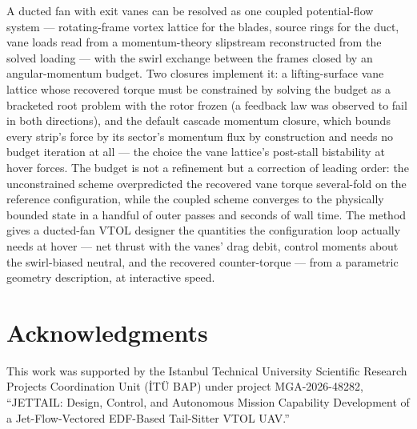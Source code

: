 \documentclass[]{aiaa-tc}%
\begin{document}
A ducted fan with exit vanes can be resolved as one coupled
potential-flow system --- rotating-frame vortex lattice for the
blades, source rings for the duct, vane loads read from a
momentum-theory slipstream reconstructed from the solved loading ---
with the swirl exchange between the frames closed by an
angular-momentum budget. Two closures implement it: a lifting-surface
vane lattice whose recovered torque must be constrained by solving the
budget as a bracketed root problem with the rotor frozen (a feedback
law was observed to fail in both directions), and the default cascade
momentum closure, which bounds every strip's force by its sector's
momentum flux by construction and needs no budget iteration at all
--- the choice the vane lattice's post-stall bistability at hover
forces. The budget is not a refinement but a correction of leading
order: the unconstrained scheme overpredicted the recovered vane
torque several-fold on the reference configuration, while the coupled
scheme converges to the physically bounded state in a handful of outer
passes and seconds of wall time. The method gives a ducted-fan VTOL
designer the quantities the configuration loop actually needs at hover
--- net thrust with the vanes' drag debit, control moments about the
swirl-biased neutral, and the recovered counter-torque --- from a
parametric geometry description, at interactive speed.


\section*{Acknowledgments}

This work was supported by the Istanbul Technical University
Scientific Research Projects Coordination Unit (\.IT\"U BAP) under
project MGA-2026-48282, ``JETTAIL: Design, Control, and Autonomous
Mission Capability Development of a Jet-Flow-Vectored EDF-Based
Tail-Sitter VTOL UAV.''



\end{document}

